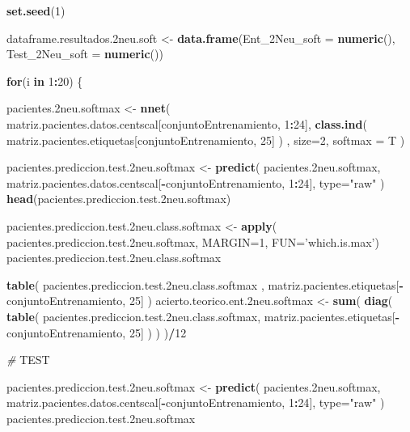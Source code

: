 \documentclass[]{article}
\newenvironment{Shaded}{\begin{snugshade}}{\end{snugshade}}
\newcommand{\KeywordTok}[1]{\textcolor[rgb]{0.13,0.29,0.53}{\textbf{#1}}}
\newcommand{\DataTypeTok}[1]{\textcolor[rgb]{0.13,0.29,0.53}{#1}}
\newcommand{\DecValTok}[1]{\textcolor[rgb]{0.00,0.00,0.81}{#1}}
\newcommand{\StringTok}[1]{\textcolor[rgb]{0.31,0.60,0.02}{#1}}
\newcommand{\CommentTok}[1]{\textcolor[rgb]{0.56,0.35,0.01}{\textit{#1}}}
\newcommand{\ControlFlowTok}[1]{\textcolor[rgb]{0.13,0.29,0.53}{\textbf{#1}}}
\newcommand{\OperatorTok}[1]{\textcolor[rgb]{0.81,0.36,0.00}{\textbf{#1}}}
\newcommand{\AlertTok}[1]{\textcolor[rgb]{0.94,0.16,0.16}{#1}}
\newcommand{\NormalTok}[1]{#1}
\begin{document}
\begin{Shaded}
\begin{Highlighting}[]
\KeywordTok{set.seed}\NormalTok{(}\DecValTok{1}\NormalTok{)}

\NormalTok{dataframe.resultados.2neu.soft <-}\StringTok{ }\KeywordTok{data.frame}\NormalTok{(}\DataTypeTok{Ent_2Neu_soft =} \KeywordTok{numeric}\NormalTok{(),}
                                             \DataTypeTok{Test_2Neu_soft =} \KeywordTok{numeric}\NormalTok{())}

\ControlFlowTok{for}\NormalTok{(i }\ControlFlowTok{in} \DecValTok{1}\OperatorTok{:}\DecValTok{20}\NormalTok{)}
\NormalTok{\{}

\NormalTok{  pacientes.2neu.softmax <-}\StringTok{ }\KeywordTok{nnet}\NormalTok{( matriz.pacientes.datos.centscal[conjuntoEntrenamiento, }\DecValTok{1}\OperatorTok{:}\DecValTok{24}\NormalTok{], }\KeywordTok{class.ind}\NormalTok{( matriz.pacientes.etiquetas[conjuntoEntrenamiento, }\DecValTok{25}\NormalTok{] ) , }\DataTypeTok{size=}\DecValTok{2}\NormalTok{, }\DataTypeTok{softmax =}\NormalTok{ T )}
  
\NormalTok{  pacientes.prediccion.test.2neu.softmax <-}\StringTok{ }\KeywordTok{predict}\NormalTok{( pacientes.2neu.softmax, matriz.pacientes.datos.centscal[}\OperatorTok{-}\NormalTok{conjuntoEntrenamiento, }\DecValTok{1}\OperatorTok{:}\DecValTok{24}\NormalTok{], }\DataTypeTok{type=}\StringTok{"raw"}\NormalTok{ )}
  \KeywordTok{head}\NormalTok{(pacientes.prediccion.test.2neu.softmax)}
  
\NormalTok{  pacientes.prediccion.test.2neu.class.softmax <-}\StringTok{ }\KeywordTok{apply}\NormalTok{( pacientes.prediccion.test.2neu.softmax, }\DataTypeTok{MARGIN=}\DecValTok{1}\NormalTok{, }\DataTypeTok{FUN=}\StringTok{'which.is.max'}\NormalTok{)}
\NormalTok{  pacientes.prediccion.test.2neu.class.softmax}
  
  \KeywordTok{table}\NormalTok{( pacientes.prediccion.test.2neu.class.softmax , matriz.pacientes.etiquetas[}\OperatorTok{-}\NormalTok{conjuntoEntrenamiento, }\DecValTok{25}\NormalTok{] )}
\NormalTok{  acierto.teorico.ent.2neu.softmax <-}\StringTok{ }\KeywordTok{sum}\NormalTok{( }\KeywordTok{diag}\NormalTok{( }\KeywordTok{table}\NormalTok{( pacientes.prediccion.test.2neu.class.softmax, matriz.pacientes.etiquetas[}\OperatorTok{-}\NormalTok{conjuntoEntrenamiento, }\DecValTok{25}\NormalTok{] ) ) )}\OperatorTok{/}\DecValTok{12}
  
  \CommentTok{# }\AlertTok{TEST}
  
\NormalTok{  pacientes.prediccion.test.2neu.softmax <-}\StringTok{ }\KeywordTok{predict}\NormalTok{( pacientes.2neu.softmax, matriz.pacientes.datos.centscal[}\OperatorTok{-}\NormalTok{conjuntoEntrenamiento, }\DecValTok{1}\OperatorTok{:}\DecValTok{24}\NormalTok{], }\DataTypeTok{type=}\StringTok{"raw"}\NormalTok{ )}
\NormalTok{  pacientes.prediccion.test.2neu.softmax}
  

\end{Highlighting}
\end{Shaded}
\end{document}
